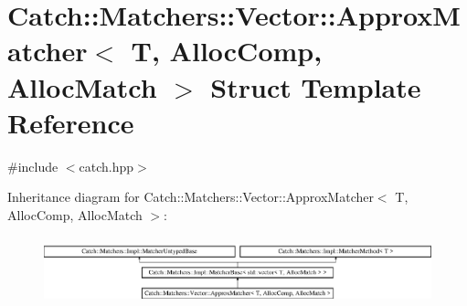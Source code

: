 \hypertarget{struct_catch_1_1_matchers_1_1_vector_1_1_approx_matcher}{}\section{Catch\+:\+:Matchers\+:\+:Vector\+:\+:Approx\+Matcher$<$ T, Alloc\+Comp, Alloc\+Match $>$ Struct Template Reference}
\label{struct_catch_1_1_matchers_1_1_vector_1_1_approx_matcher}


{\ttfamily \#include $<$catch.\+hpp$>$}

Inheritance diagram for Catch\+:\+:Matchers\+:\+:Vector\+:\+:Approx\+Matcher$<$ T, Alloc\+Comp, Alloc\+Match $>$\+:\begin{figure}[H]
\begin{center}
\leavevmode
\includegraphics[height=1.981132cm]{struct_catch_1_1_matchers_1_1_vector_1_1_approx_matcher}
\end{center}
\end{figure}
